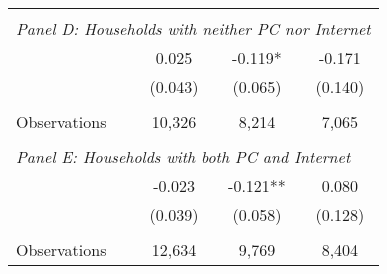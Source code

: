 {\begin{tabular}{lccc}
&  &  &   \\
\multicolumn{4}{l}{\textit{Panel D: Households with neither PC nor Internet}} \\
\hspace{3mm}        &       0.025   &      -0.119*  &      -0.171   \\
                    &     (0.043)   &     (0.065)   &     (0.140)   \\
                    &               &               &               \\
\hspace{3mm}Observations&      10,326   &       8,214   &       7,065   \\
 
&  &  &   \\
\multicolumn{4}{l}{\textit{Panel E: Households with both PC and Internet}} \\
\hspace{3mm}        &      -0.023   &      -0.121** &       0.080   \\
                    &     (0.039)   &     (0.058)   &     (0.128)   \\
                    &               &               &               \\
\hspace{3mm}Observations&      12,634   &       9,769   &       8,404   \\
 

\bottomrule
\end{tabular}
}
